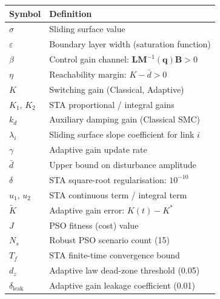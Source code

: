 \documentclass[10pt, a4paper]{article}
\newcommand{\vq}{\boldsymbol{q}}
\begin{document}
\begin{center}
\small
\begin{tabular}{@{}ll@{}}
\toprule
\textbf{Symbol} & \textbf{Definition} \\
\midrule
$\sigma$           & Sliding surface value \\
$\varepsilon$      & Boundary layer width (saturation function) \\
$\beta$            & Control gain channel: $\mathbf{L}\mathbf{M}^{-1}(\vq)\mathbf{B} > 0$ \\
$\eta$             & Reachability margin: $K - \bar{d} > 0$ \\
$K$                & Switching gain (Classical, Adaptive) \\
$K_1,\, K_2$       & STA proportional / integral gains \\
$k_d$              & Auxiliary damping gain (Classical SMC) \\
$\lambda_i$        & Sliding surface slope coefficient for link $i$ \\
$\gamma$           & Adaptive gain update rate \\
$\bar{d}$          & Upper bound on disturbance amplitude \\
$\delta$           & STA square-root regularisation: $10^{-10}$ \\
$u_1,\, u_2$       & STA continuous term / integral term \\
$\tilde{K}$        & Adaptive gain error: $K(t) - K^*$ \\
$J$                & PSO fitness (cost) value \\
$N_s$              & Robust PSO scenario count (15) \\
$T_f$              & STA finite-time convergence bound \\
$d_z$              & Adaptive law dead-zone threshold (0.05) \\
$\delta_\text{leak}$ & Adaptive gain leakage coefficient (0.01) \\
\bottomrule
\end{tabular}
\end{center}

\end{document}
